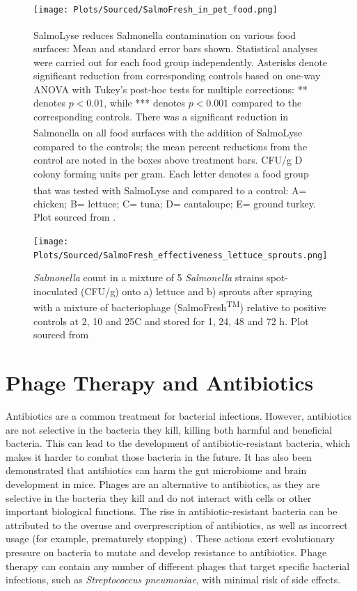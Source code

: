 \begin{figure}[ht!]
    \centering
    \texttt{[image: Plots/Sourced/SalmoFresh\_in\_pet\_food.png]}
    \caption{SalmoLyse\textsuperscript{\textregistered} reduces Salmonella contamination on various food surfaces: Mean and standard error bars shown.
 Statistical analyses were carried out for each food group independently.
 Asterisks denote significant reduction from corresponding controls based on one-way ANOVA with Tukey’s post-hoc tests for multiple corrections: ** denotes $p < 0.01$, while *** denotes $p < 0.001$ compared to the corresponding controls.
 There was a significant reduction in Salmonella on all food surfaces with the addition of SalmoLyse\textsuperscript{\textregistered} compared to the controls; the mean percent reductions from the control are noted in the boxes above treatment bars.
 CFU/g D colony forming units per gram.
 Each letter denotes a food group that was tested with SalmoLyse\textsuperscript{\textregistered} and compared to a control: A= chicken; B= lettuce; C= tuna; D= cantaloupe; E= ground turkey. Plot sourced from \citet{sofferBacteriophagesSafelyReduce2016}. 
 }
    \label{fig:SalmoFresh_in_pet_food}
\end{figure}

\begin{figure}[ht!]
    \centering
    \texttt{[image: Plots/Sourced/SalmoFresh\_effectiveness\_lettuce\_sprouts.png]}
    \caption{\textit{Salmonella} count in a mixture of 5 \textit{Salmonella} strains spot-inoculated (CFU/g) onto a) lettuce and b) sprouts after spraying with a mixture of bacteriophage (SalmoFresh\textsuperscript{TM}) relative to positive controls at 2, 10 and 25C and stored for 1, 24, 48 and 72 h. Plot sourced from \citet{zhangSalmoFreshEffectivenessControlling2019}}
    \label{fig:SalmoFresh_effectiveness_lettuce_sprouts}
\end{figure}


\section{Phage Therapy and Antibiotics}
\label{sec:AppendixB:phage_therapy_and_antibiotics}
Antibiotics are a common treatment for bacterial infections.
However, antibiotics are not selective in the bacteria they kill, killing both harmful and beneficial bacteria.
This can lead to the development of antibiotic-resistant bacteria, which makes it harder to combat those bacteria in the future.
It has also been demonstrated that antibiotics can harm the gut microbiome and brain development in mice.
Phages are an alternative to antibiotics, as they are selective in the bacteria they kill and do not interact with cells or other important biological functions.
The rise in antibiotic-resistant bacteria can be attributed to the overuse and overprescription of antibiotics, as well as incorrect usage (for example, prematurely stopping) \cite{odonkorBacteriaResistanceAntibiotics2011}.
These actions exert evolutionary pressure on bacteria to mutate and develop resistance to antibiotics. 
Phage therapy can contain any number of different phages that target specific bacterial infections, such as \textit{Streptococcus pneumoniae}, with minimal risk of side effects.

